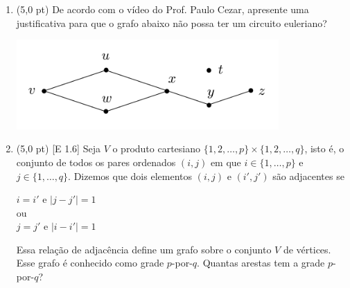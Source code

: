 \documentclass[12pt,a4paper,oneside]{article}
\begin{document}
\begin{enumerate}

	\item (5,0 pt) De acordo com o vídeo do Prof. Paulo Cezar, apresente uma justificativa para que o grafo abaixo não possa ter um circuito euleriano?
	\begin{center}
	    \includegraphics[width=10cm]{images/grafo.png}
	\end{center}
	
	\item (5,0 pt) [E 1.6] Seja $V$ o produto cartesiano $\{1,2, \ldots, p\} \times \{1,2, \ldots, q\}$, isto é, o conjunto de todos os pares ordenados $(i,j)$ em que $i \in \{1, \ldots, p\}$ e  $j \in \{1, \ldots, q\}$. Dizemos que dois elementos $(i,j)$ e $(i',j')$ são adjacentes se 
	\begin{center}
	    $i = i'$ e $|j - j'|=1$ \\
	    ou \\
	    $j = j'$ e $|i - i'|=1$
	\end{center}
	Essa relação de adjacência define um grafo sobre o conjunto $V$ de vértices. Esse grafo é conhecido como grade $p$-por-$q$. Quantas arestas tem a grade $p$-por-$q$?
	
	\end{enumerate}
\end{document}
